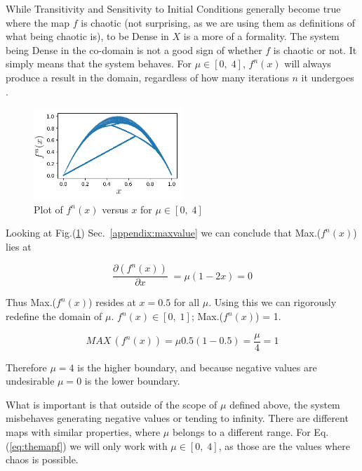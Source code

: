 While Transitivity and Sensitivity to Initial Conditions generally become
true where the map $f$ is chaotic (not surprising, as we are using them as
definitions of what being chaotic is), to be Dense in $X$ is a more of a formality.
The system being Dense in the co-domain is not a good sign of whether $f$ is
chaotic or not. It simply means that the system behaves. For $\mu \in [0,\; 4]$,
$f^n (x)$ will always produce a result in the domain, regardless of how many
iterations $n$ it undergoes \cite{baker} .\\

\begin{figure}[h]
    \centering
    \includegraphics[width=0.5\textwidth]{Images/max at 0.png}
    \caption{Plot of $f^n(x)$ versus $x$ for $\mu \in [0,\; 4]$}
    \label{fig:topof0}
\end{figure}

Looking at Fig.(\ref{fig:topof0}) Sec.~\ref{appendix:maxvalue} we can conclude that Max.($f^n(x)$) lies at

\begin{equation}
    \frac{\partial (f^n(x))}{\partial x}\; = \mu (1 - 2x) = 0 
\end{equation}

Thus Max.($f^n(x)$) resides at $x = 0.5$ for all $\mu$. Using this we can rigorously redefine the domain of $\mu$.
$f^n(x) \in [0,\; 1]$; Max.($f^n(x)$) = 1. 

\begin{equation}
    MAX\,(f^n(x)) = \mu 0.5 (1 - 0.5) = \frac{\mu}{4} = 1
\end{equation}
    


Therefore $\mu = 4$ is the higher boundary, and because negative values are undesirable
$\mu = 0$ is the lower boundary.

What is important is that outside of the scope of $\mu$ defined above, the system misbehaves
generating negative values or tending to infinity. There are different maps
with similar properties, where $\mu$ belongs to a different range. For 
Eq.(\ref{eq:themapf}) we will only work with $\mu \in [0,\; 4]$, as those are the values
where chaos is possible.





